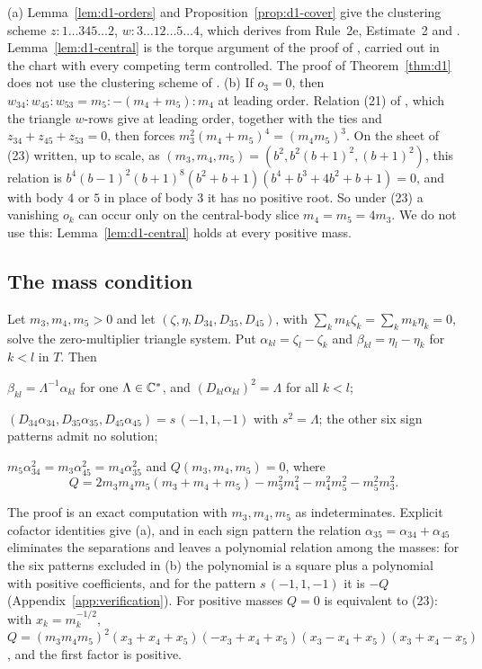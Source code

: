 \begin{remark}\label{rem:d1-ak}
(a) Lemma~\ref{lem:d1-orders} and Proposition~\ref{prop:d1-cover} give the clustering scheme
$z:1\ldots345\ldots2$, $w:3\ldots12\ldots5\ldots4$, which
\cite[\S8.1, p.~572]{AK} derives from Rule~2e, Estimate~2 and \cite[Prop.~4]{AK}.
Lemma~\ref{lem:d1-central} is the torque argument of the proof of \cite[Prop.~4]{AK}, carried out
in the chart with every competing term controlled.  The proof of Theorem~\ref{thm:d1} does not
use the clustering scheme of \cite[\S8.1]{AK}.
(b) If $o_3=0$, then $w_{34}:w_{45}:w_{53}=m_5:-(m_4+m_5):m_4$ at leading order.  Relation (21)
of \cite{AK}, which the triangle $w$-rows give at leading order, together with the ties and
$z_{34}+z_{45}+z_{53}=0$, then forces $m_3^2(m_4+m_5)^4=(m_4m_5)^3$.  On the sheet of (23) written, up to scale, as
$(m_3,m_4,m_5)=(b^2,b^2(b+1)^2,(b+1)^2)$, this relation is
$b^4(b-1)^2(b+1)^8(b^2+b+1)(b^4+b^3+4b^2+b+1)=0$, and with body $4$ or $5$ in place of body $3$ it
has no positive root.  So under (23) a vanishing $o_k$ can occur only on the central-body slice
$m_4=m_5=4m_3$.  We do not use this: Lemma~\ref{lem:d1-central} holds at every positive mass.
\end{remark}

\subsection{The mass condition}

\begin{lemma}\label{lem:d1-shape}
Let $m_3,m_4,m_5>0$ and let $(\zeta,\eta,D_{34},D_{35},D_{45})$, with
$\sum_km_k\zeta_k=\sum_km_k\eta_k=0$, solve the zero-multiplier triangle system.  Put
$\alpha_{kl}=\zeta_l-\zeta_k$ and $\beta_{kl}=\eta_l-\eta_k$ for $k<l$ in $T$.  Then
\begin{alphalist}
  \item $\beta_{kl}=\Lambda^{-1}\alpha_{kl}$ for one $\Lambda\in\mathbb{C}^*$, and $(D_{kl}\alpha_{kl})^2=
  \Lambda$ for all $k<l$;
  \item $(D_{34}\alpha_{34},D_{35}\alpha_{35},D_{45}\alpha_{45})=s\,(-1,1,-1)$ with $s^2=\Lambda$;
  the other six sign patterns admit no solution;
  \item $m_5\alpha_{34}^2=m_3\alpha_{45}^2=m_4\alpha_{35}^2$ and $Q(m_3,m_4,m_5)=0$, where
  \[
    Q=2m_3m_4m_5(m_3+m_4+m_5)-m_3^2m_4^2-m_4^2m_5^2-m_5^2m_3^2 .
  \]
\end{alphalist}
\end{lemma}
The proof is an exact computation with $m_3,m_4,m_5$ as indeterminates.  Explicit cofactor
identities give (a), and in each sign pattern the relation $\alpha_{35}=\alpha_{34}+\alpha_{45}$
eliminates the separations and leaves a polynomial relation among the masses: for the six
patterns excluded in (b) the polynomial is a square plus a polynomial with positive
coefficients, and for the pattern $s\,(-1,1,-1)$ it is $-Q$ (Appendix~\ref{app:verification}).
For positive masses $Q=0$ is equivalent to (23): with $x_k=m_k^{-1/2}$,
$Q=(m_3m_4m_5)^2(x_3+x_4+x_5)(-x_3+x_4+x_5)(x_3-x_4+x_5)(x_3+x_4-x_5)$, and the first factor is
positive.


